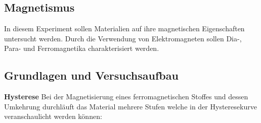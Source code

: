 \documentclass[12pt,a4paper]{article}
\begin{document}
\begin{multicols}{2}




%			




\section{Magnetismus}
In diesem Experiment sollen Materialien auf ihre magnetischen Eigenschaften untersucht werden. Durch die Verwendung von Elektromagneten sollen Dia-, Para- und Ferromagnetika charakterisiert werden.

\subsection{Grundlagen und Versuchsaufbau}

\textbf{Hysterese}
Bei der Magnetisierung eines ferromagnetischen Stoffes und dessen Umkehrung durchläuft das Material mehrere Stufen welche in der Hysteresekurve veranschaulicht werden können:


\end{multicols}
\end{document}
